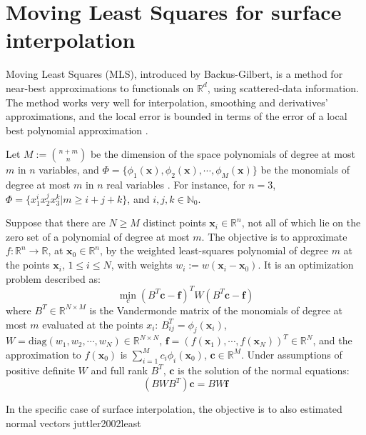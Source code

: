 \section{Moving Least Squares for surface interpolation}
Moving Least Squares (MLS), introduced by Backus-Gilbert, is a method for
near-best approximations to functionals on $\mathbb{R}^d$, using scattered-data
information. The method works very well for interpolation, smoothing and
derivatives' approximations, and the local error is bounded in terms of the
error of a local best polynomial approximation \cite{levin1998approximation}.

Let $M := {n+m \choose n}$ be the dimension of the space polynomials of degree
at most $m$ in $n$ variables, and $\Phi =
\{\phi_1(\textbf{x}),\phi_2(\textbf{x}),\cdots, \phi_M(\textbf{x})\}$ be the
monomials of degree at most $m$ in $n$ real variables \cite{bos1989moving}. For
instance, for $n=3$, $\Phi=\{x_1^i x_2^j x_3^k  | m \geq i+j+k\}$, and $i, j, k
\in \mathbb{N}_0$. 

Suppose that there are $N \geq M$ distinct points
$\textbf{x}_i \in \mathbb{R}^n$, not all of which lie on the zero set of a
polynomial of degree at most $m$. The objective is to approximate
$f:\mathbb{R}^n \rightarrow \mathbb{R}$, at $\textbf{x}_0 \in \mathbb{R}^n$, by
the weighted least-squares polynomial of degree $m$ at the points
$\textbf{x}_i$, $1\leq i \leq N$, with weights $w_i :=
w(\textbf{x}_i-\textbf{x}_0)$. It is an optimization problem described as:
\begin{equation}
\min_c (B^T\textbf{c}-\textbf{f})^TW(B^T\textbf{c}-\textbf{f})
\end{equation}
where $B^T \in \mathbb{R}^{N\times M}$ is the Vandermonde matrix of the
monomials of degree at most $m$ evaluated at the points $x_i$:
$B_{ij}^T=\phi_j(\textbf{x}_i)$, $W=\textrm{diag}(w_1,w_2,\cdots,w_N) \in
\mathbb{R}^{N\times N}$, $\textbf{f}=(f(\textbf{x}_1),\cdots,f(\textbf{x}_N))^T
\in \mathbb{R}^N$, and the approximation to $f(\textbf{x}_0)$ is
$\sum_{i=1}^{M}c_i\phi_i(\textbf{x}_0)$, $\textbf{c} \in \mathbb{R}^M$. Under
assumptions of positive definite $W$ and full rank $B^T$, $\textbf{c}$ is the
solution of the normal equations:
\begin{equation}
(BWB^T)\textbf{c}=BW\textbf{f}
\end{equation}

In the specific case of surface interpolation, the objective is to
also estimated normal vectors juttler2002least
